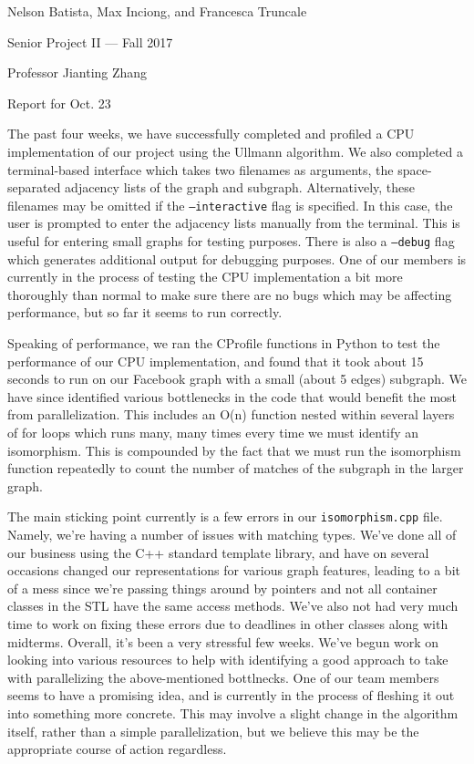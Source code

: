 \documentclass{article}
\begin{document}
\noindent Nelson Batista, Max Inciong, and Francesca Truncale

\noindent Senior Project II --- Fall 2017

\noindent Professor Jianting Zhang

\noindent Report for Oct. 23

The past four weeks, we have successfully completed and profiled a CPU implementation of our project using the Ullmann algorithm. We also completed a terminal-based interface which takes two filenames as arguments, the space-separated adjacency lists of the graph and subgraph. Alternatively, these filenames may be omitted if the \texttt{--interactive} flag is specified. In this case, the user is prompted to enter the adjacency lists manually from the terminal. This is useful for entering small graphs for testing purposes. There is also a \texttt{--debug} flag which generates additional output for debugging purposes. One of our members is currently in the process of testing the CPU implementation a bit more thoroughly than normal to make sure there are no bugs which may be affecting performance, but so far it seems to run correctly.

Speaking of performance, we ran the CProfile functions in Python to test the performance of our CPU implementation, and found that it took about 15 seconds to run on our Facebook graph with a small (about 5 edges) subgraph. We have since identified various bottlenecks in the code that would benefit the most from parallelization. This includes an O(n) function nested within several layers of for loops which runs many, many times every time we must identify an isomorphism. This is compounded by the fact that we must run the isomorphism function repeatedly to count the number of matches of the subgraph in the larger graph.

The main sticking point currently is a few errors in our \texttt{isomorphism.cpp} file. Namely, we're having a number of issues with matching types. We've done all of our business using the C++ standard template library, and have on several occasions changed our representations for various graph features, leading to a bit of a mess since we're passing things around by pointers and not all container classes in the STL have the same access methods. We've also not had very much time to work on fixing these errors due to deadlines in other classes along with midterms. Overall, it's been a very stressful few weeks. We've begun work on looking into various resources to help with identifying a good approach to take with parallelizing the above-mentioned bottlnecks. One of our team members seems to have a promising idea, and is currently in the process of fleshing it out into something more concrete. This may involve a slight change in the algorithm itself, rather than a simple parallelization, but we believe this may be the appropriate course of action regardless.
\end{document}
